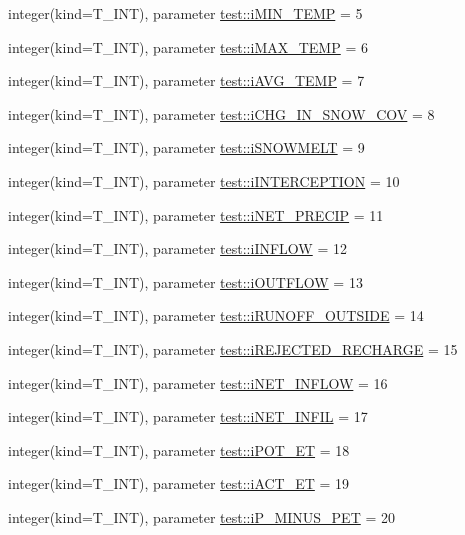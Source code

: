 \begin{DoxyCompactItemize}
\item 
integer(kind=T\_\-INT), parameter \hyperlink{namespacetest_adbc94b4c943a3bf4995dff5b8d7ba7c3}{test::iMIN\_\-TEMP} = 5
\item 
integer(kind=T\_\-INT), parameter \hyperlink{namespacetest_ad4e8b276391e3cbc8cc135dfa7b10971}{test::iMAX\_\-TEMP} = 6
\item 
integer(kind=T\_\-INT), parameter \hyperlink{namespacetest_a9b67c0e46fcbed22fc39728c65d345f9}{test::iAVG\_\-TEMP} = 7
\item 
integer(kind=T\_\-INT), parameter \hyperlink{namespacetest_a137ea45f2f434266edd47e7fc2b17c1b}{test::iCHG\_\-IN\_\-SNOW\_\-COV} = 8
\item 
integer(kind=T\_\-INT), parameter \hyperlink{namespacetest_a0d778816066d21ff37157e9e33ffa64d}{test::iSNOWMELT} = 9
\item 
integer(kind=T\_\-INT), parameter \hyperlink{namespacetest_a51eed4733166940c15eaafaa291fc55b}{test::iINTERCEPTION} = 10
\item 
integer(kind=T\_\-INT), parameter \hyperlink{namespacetest_aa863a0c7e87979b7d13b34f5afb7ecf5}{test::iNET\_\-PRECIP} = 11
\item 
integer(kind=T\_\-INT), parameter \hyperlink{namespacetest_a47075af8f8a4e815471731dc40aa7928}{test::iINFLOW} = 12
\item 
integer(kind=T\_\-INT), parameter \hyperlink{namespacetest_af391688ace32e5cfa1f0e6edf6499758}{test::iOUTFLOW} = 13
\item 
integer(kind=T\_\-INT), parameter \hyperlink{namespacetest_a4e979c97a931d097b815a1e8b62663f9}{test::iRUNOFF\_\-OUTSIDE} = 14
\item 
integer(kind=T\_\-INT), parameter \hyperlink{namespacetest_a0e9159063b997894c4a07927cbe42140}{test::iREJECTED\_\-RECHARGE} = 15
\item 
integer(kind=T\_\-INT), parameter \hyperlink{namespacetest_afafe0185b588b6c2503ad2cdfaccd5a7}{test::iNET\_\-INFLOW} = 16
\item 
integer(kind=T\_\-INT), parameter \hyperlink{namespacetest_aefca9a9826cf4312056bd27752aece6d}{test::iNET\_\-INFIL} = 17
\item 
integer(kind=T\_\-INT), parameter \hyperlink{namespacetest_a0b4cecb0049250b0df7313899555765c}{test::iPOT\_\-ET} = 18
\item 
integer(kind=T\_\-INT), parameter \hyperlink{namespacetest_a76800e5ee56fa8c6e4612e43dc56cb8b}{test::iACT\_\-ET} = 19
\item 
integer(kind=T\_\-INT), parameter \hyperlink{namespacetest_a15fc27f3f9430eb7fa5343da57124560}{test::iP\_\-MINUS\_\-PET} = 20

\end{DoxyCompactItemize}
